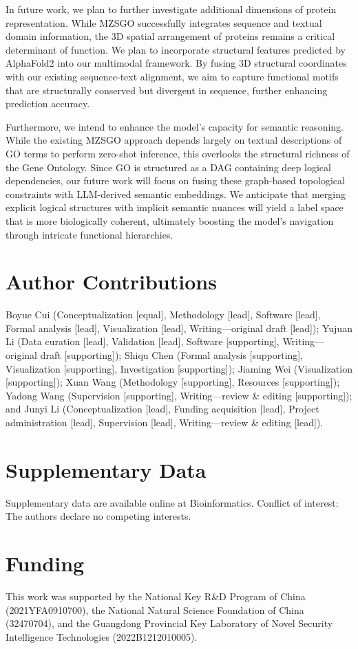 \documentclass[unnumsec,webpdf,contemporary,large]{oup-authoring-template}%
\theoremstyle{thmstyleone}%
\theoremstyle{thmstyletwo}%
\theoremstyle{thmstylethree}%
\begin{document}
In future work, we plan to further investigate additional dimensions of protein representation. While MZSGO successfully integrates sequence and textual domain information, the 3D spatial arrangement of proteins remains a critical determinant of function. We plan to incorporate structural features predicted by AlphaFold2 into our multimodal framework. By fusing 3D structural coordinates with our existing sequence-text alignment, we aim to capture functional motifs that are structurally conserved but divergent in sequence, further enhancing prediction accuracy.

Furthermore, we intend to enhance the model's capacity for semantic reasoning. While the existing MZSGO approach depends largely on textual descriptions of GO terms to perform zero-shot inference, this overlooks the structural richness of the Gene Ontology. Since GO is structured as a DAG containing deep logical dependencies, our future work will focus on fusing these graph-based topological constraints with LLM-derived semantic embeddings. We anticipate that merging explicit logical structures with implicit semantic nuances will yield a label space that is more biologically coherent, ultimately boosting the model's navigation through intricate functional hierarchies.\citep{hoang2025locality}

\section{Author Contributions}

Boyue Cui (Conceptualization [equal], Methodology [lead], Software [lead],
Formal analysis [lead], Visualization [lead], Writing—original draft [lead]);
Yujuan Li (Data curation [lead], Validation [lead], Software [supporting],
Writing—original draft [supporting]); Shiqu Chen (Formal analysis [supporting],
Visualization [supporting], Investigation [supporting]); Jiaming Wei (Visualization [supporting]); Xuan Wang (Methodology
[supporting], Resources [supporting]); Yadong Wang (Supervision [supporting],
Writing—review \& editing [supporting]); and Junyi Li (Conceptualization [lead],
Funding acquisition [lead], Project administration [lead], Supervision [lead],
Writing—review \& editing [lead]).


\section{Supplementary Data}
Supplementary data are available online at Bioinformatics.
Conflict of interest: The authors declare no competing interests.

\section{Funding}
This work was supported by the National Key R\&D Program of China (2021YFA0910700), 
the National Natural Science Foundation of China (32470704), 
and the Guangdong Provincial Key Laboratory of Novel Security Intelligence Technologies (2022B1212010005).


 
\end{document}
